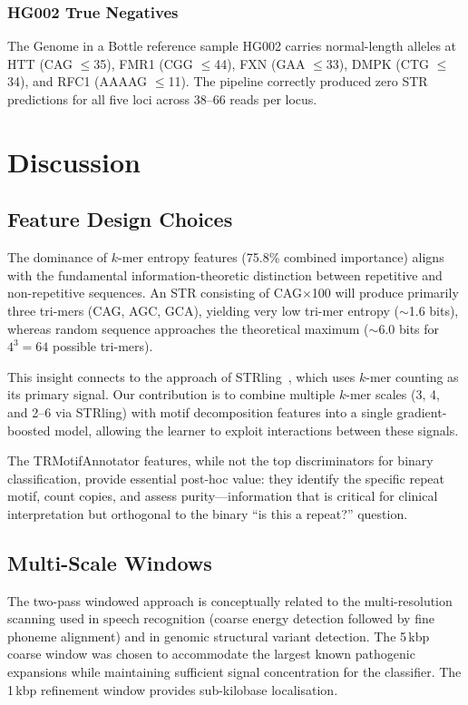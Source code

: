 \documentclass[11pt,twocolumn]{article}
\begin{document}
\subsubsection{HG002 True Negatives}

The Genome in a Bottle reference sample HG002 carries normal-length
alleles at HTT (CAG $\leq$35), FMR1 (CGG $\leq$44), FXN (GAA $\leq$33),
DMPK (CTG $\leq$34), and RFC1 (AAAAG $\leq$11).  The pipeline correctly
produced zero STR predictions for all five loci across 38--66 reads per
locus.

\section{Discussion}\label{sec:discussion}

\subsection{Feature Design Choices}

The dominance of $k$-mer entropy features (75.8\% combined importance)
aligns with the fundamental information-theoretic distinction between
repetitive and non-repetitive sequences.  An STR consisting of
CAG$\times$100 will produce primarily three tri-mers (CAG, AGC, GCA),
yielding very low tri-mer entropy ($\sim$1.6 bits), whereas random
sequence approaches the theoretical maximum ($\sim$6.0 bits for
$4^3 = 64$ possible tri-mers).

This insight connects to the approach of STRling~\citep{dashnow2022},
which uses $k$-mer counting as its primary signal.  Our contribution
is to combine multiple $k$-mer scales (3, 4, and 2--6 via STRling) with
motif decomposition features into a single gradient-boosted model,
allowing the learner to exploit interactions between these signals.

The TRMotifAnnotator features, while not the top discriminators for
binary classification, provide essential post-hoc value: they identify
the specific repeat motif, count copies, and assess purity---information
that is critical for clinical interpretation but orthogonal to the
binary ``is this a repeat?'' question.

\subsection{Multi-Scale Windows}

The two-pass windowed approach is conceptually related to the
multi-resolution scanning used in speech recognition (coarse energy
detection followed by fine phoneme alignment) and in genomic structural
variant detection.  The 5\,kbp coarse window was chosen to accommodate
the largest known pathogenic expansions while maintaining sufficient
signal concentration for the classifier.  The 1\,kbp refinement window
provides sub-kilobase localisation.
\end{document}
